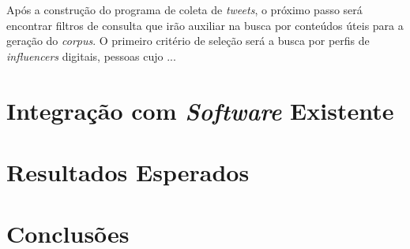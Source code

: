 Após a construção do programa de coleta de \textit{tweets}, o próximo passo será encontrar filtros de consulta que irão auxiliar na busca por conteúdos úteis para a geração do \textit{corpus}. O primeiro critério de seleção será a busca por perfis de \textit{influencers} digitais, pessoas cujo ... 

\section{Integração com \textit{Software} Existente}
\section{Resultados Esperados}
\section{Conclusões}
